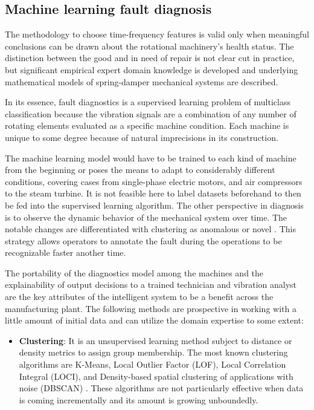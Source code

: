 \documentclass[11pt, a4paper, english]{article}
\begin{document}
\begin{refsection}
\subsection{Machine learning fault diagnosis}
The methodology to choose time-frequency features is valid only when meaningful conclusions can be drawn about the rotational machinery's health status. The distinction between the good and in need of repair is not clear cut in practice, but significant empirical expert domain knowledge is developed \cite{ziaran_technicka_2013} \cite{kreidl_technicka_2006} \cite{scheffer_practical_2004} and underlying mathematical models of spring-damper mechanical systems are described.

In its essence, fault diagnostics is a supervised learning problem of multiclass classification because the vibration signals are a combination of any number of rotating elements evaluated as a specific machine condition. Each machine is unique to some degree because of natural imprecisions in its construction. 

The machine learning model would have to be trained to each kind of machine from the beginning or poses the means to adapt to considerably different conditions, covering cases from single-phase electric motors, and air compressors to the steam turbine. It is not feasible here to label datasets beforehand to then be fed into the supervised learning algorithm. The other perspective in diagnosis is to observe the dynamic behavior of the mechanical system over time. The notable changes are differentiated with clustering as anomalous or novel  \cite{hu_intelligent_2012} \cite{caldero_multi-channel_2019}. This strategy allows operators to annotate the fault during the operations to be recognizable faster another time.

The portability of the diagnostics model among the machines and the explainability of output decisions to a trained technician and vibration analyst are the key attributes of the intelligent system to be a benefit across the manufacturing plant. The following methods are prospective in working with a little amount of initial data and can utilize the domain expertise to some extent:

\begin{itemize}
\item \textbf{Clustering}: It is an unsupervised learning method subject to distance or density metrics to assign group membership.  The most known clustering algorithms are K-Means, Local Outlier Factor (LOF), Local Correlation Integral  (LOCI), and Density-based spatial clustering of applications with noise (DBSCAN) \cite{aggarwal_outlier_2016}. These algorithms are not particularly effective when data is coming incrementally and its amount is growing unboundedly. 


\end{itemize}
\end{refsection}
\end{document}
